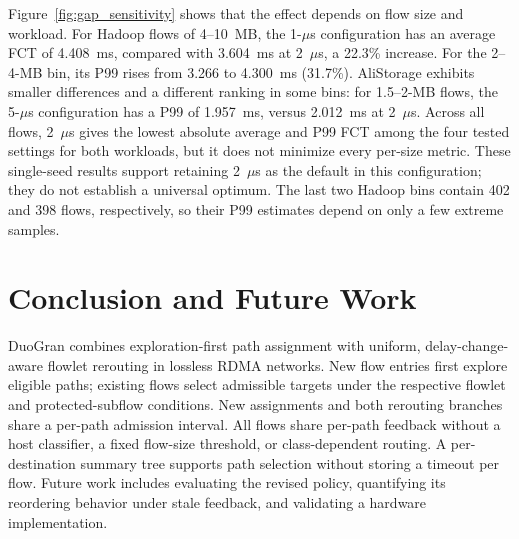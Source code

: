 \documentclass[10pt,journal,compsoc]{IEEEtran}
\begin{document}
Figure~\ref{fig:gap_sensitivity} shows that the effect depends on flow size and workload. For Hadoop flows of 4--10~MB, the 1-$\mu$s configuration has an average FCT of 4.408~ms, compared with 3.604~ms at 2~$\mu$s, a 22.3\% increase. For the 2--4-MB bin, its P99 rises from 3.266 to 4.300~ms (31.7\%). AliStorage exhibits smaller differences and a different ranking in some bins: for 1.5--2-MB flows, the 5-$\mu$s configuration has a P99 of 1.957~ms, versus 2.012~ms at 2~$\mu$s. Across all flows, 2~$\mu$s gives the lowest absolute average and P99 FCT among the four tested settings for both workloads, but it does not minimize every per-size metric. These single-seed results support retaining 2~$\mu$s as the default in this configuration; they do not establish a universal optimum. The last two Hadoop bins contain 402 and 398 flows, respectively, so their P99 estimates depend on only a few extreme samples.

\newpage
\section{Conclusion and Future Work}
DuoGran combines exploration-first path assignment with uniform, delay-change-aware flowlet rerouting in lossless RDMA networks. New flow entries first explore eligible paths; existing flows select admissible targets under the respective flowlet and protected-subflow conditions. New assignments and both rerouting branches share a per-path admission interval. All flows share per-path feedback without a host classifier, a fixed flow-size threshold, or class-dependent routing. A per-destination summary tree supports path selection without storing a timeout per flow. Future work includes evaluating the revised policy, quantifying its reordering behavior under stale feedback, and validating a hardware implementation.





\end{document}
